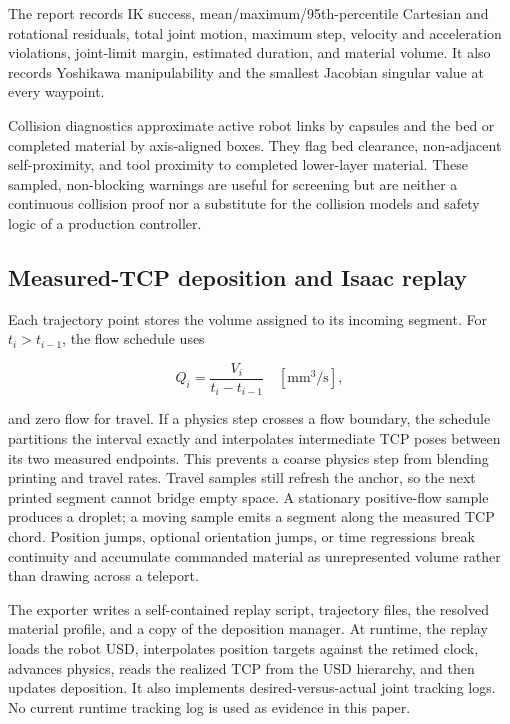 \documentclass[letterpaper,10pt,conference]{ieeeconf}
\begin{document}
The report records IK success, mean/maximum/95th-percentile Cartesian and
rotational residuals, total joint motion, maximum step, velocity and
acceleration violations, joint-limit margin, estimated duration, and material
volume.  It also records Yoshikawa manipulability and the smallest Jacobian
singular value at every waypoint.

Collision diagnostics approximate active robot links by capsules and the bed or
completed material by axis-aligned boxes.  They flag bed clearance,
non-adjacent self-proximity, and tool proximity to completed lower-layer
material.  These sampled, non-blocking warnings are useful for screening but
are neither a continuous collision proof nor a substitute for the collision
models and safety logic of a production controller.

\subsection{Measured-TCP deposition and Isaac replay}

Each trajectory point stores the volume assigned to its incoming segment.  For
\(t_i>t_{i-1}\), the flow schedule uses

\begin{equation}
  Q_i = \frac{V_i}{t_i-t_{i-1}}
  \quad [\si{\milli\meter\cubed\per\second}],
  \label{eq:flow}
\end{equation}

and zero flow for travel.  If a physics step crosses a flow boundary, the
schedule partitions the interval exactly and interpolates intermediate TCP
poses between its two measured endpoints.  This prevents a coarse physics step
from blending printing and travel rates.  Travel samples still refresh the
anchor, so the next printed segment cannot bridge empty space.  A stationary
positive-flow sample produces a droplet; a moving sample emits a segment along
the measured TCP chord.  Position jumps, optional orientation jumps, or time
regressions break continuity and accumulate commanded material as unrepresented
volume rather than drawing across a teleport.

The exporter writes a self-contained replay script, trajectory files, the
resolved material profile, and a copy of the deposition manager.  At runtime,
the replay loads the robot USD, interpolates position targets against the
retimed clock, advances physics, reads the realized TCP from the USD hierarchy,
and then updates deposition.  It also implements desired-versus-actual joint
tracking logs.  No current runtime tracking log is used as evidence in this
paper.
\end{document}
